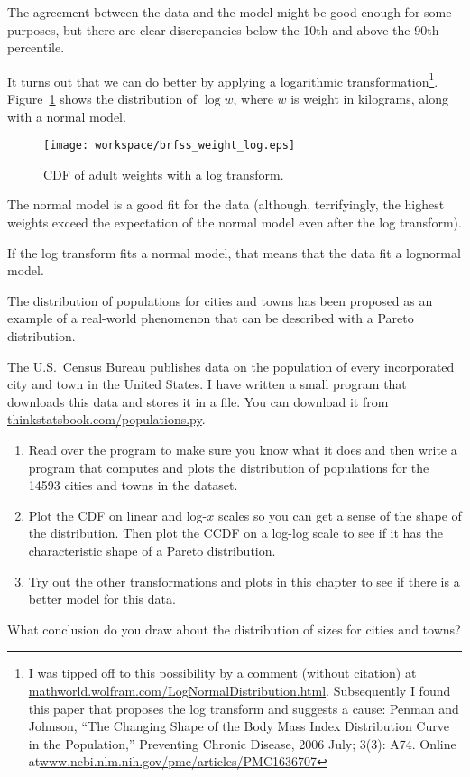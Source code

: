 \documentclass[10pt]{book}
\begin{document}
The agreement between the data and the model might be good enough
for some purposes, but there are clear discrepancies below the 10th
and above the 90th percentile.

It turns out that we can do better by applying a logarithmic
transformation\footnote{I was tipped off to this possibility by a
  comment (without citation) at
  \url{mathworld.wolfram.com/LogNormalDistribution.html}.
  Subsequently I found this paper that proposes the log transform and
  suggests a cause: Penman and Johnson, ``The Changing Shape of the
  Body Mass Index Distribution Curve in the Population,'' Preventing
  Chronic Disease, 2006 July; 3(3): A74.  Online
  at\url{www.ncbi.nlm.nih.gov/pmc/articles/PMC1636707}}.
Figure~\ref{brfss_weight_log} shows the distribution
of $\log w$, where $w$ is weight in kilograms, along with a normal
model.

\begin{figure}
\centerline{\texttt{[image: workspace/brfss\_weight\_log.eps]}}
\caption{CDF of adult weights with a log transform.}
\label{brfss_weight_log}
\end{figure}

The normal model is a good fit for the data (although, terrifyingly, the
highest weights exceed the expectation of the normal model even after
the log transform).

If the log transform fits a normal model, that means that the data
fit a lognormal model.

\begin{ex}
The distribution of populations for cities and towns has been proposed
as an example of a real-world phenomenon that can be described
with a Pareto distribution.

The U.S.~Census Bureau publishes data on the population of every
incorporated city and town in the United States.  I have written a
small program that downloads this data and stores it in a file.  You
can download it from \url{thinkstatsbook.com/populations.py}.

\begin{enumerate}

\item Read over the program to make sure you know what it does and then
  write a program that computes and plots the distribution of
  populations for the 14593 cities and towns in the dataset.

\item Plot the CDF on linear and log-$x$ scales so you can get a sense
  of the shape of the distribution.  Then plot the CCDF on a log-log
  scale to see if it has the characteristic shape of a Pareto
  distribution.

\item Try out the other transformations and plots in this chapter to
  see if there is a better model for this data.

\end{enumerate}

What conclusion do you draw about the distribution of sizes
for cities and towns?

\end{ex}
\end{document}

